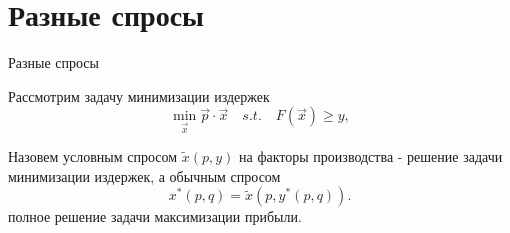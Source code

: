 \documentclass{beamer}
\begin{document}
\section{Разные спросы}

\begin{frame}{Разные спросы}

Рассмотрим задачу минимизации издержек
$$ \min_{\vec x} \vec p \cdot \vec x \quad s.t. \quad F(\vec x) \geqslant y,$$

\begin{definition}
Назовем условным спросом $\tilde x(p, y)$ на факторы производства - решение задачи минимизации издержек, а обычным спросом
$$x^{\ast}(p, q) = \tilde x(p, y^{\ast}(p, q)).$$
полное решение задачи максимизации прибыли.
\end{definition}

\end{frame}
%
%
%
%
%
%
%
%
%
%
%
%
%
%
\end{document}
